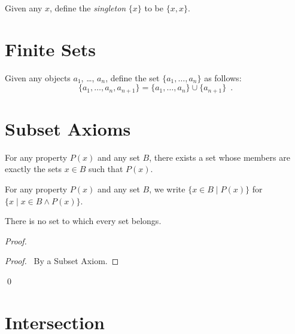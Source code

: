 \begin{definition}
    Given any $x$, define the \emph{singleton} $\{ x \}$ to be $\{ x, x \}$.    
\end{definition}

\section{Finite Sets}

\begin{definitions}
    Given any objects $a_1$, \ldots, $a_n$, define the set $\{ a_1, \ldots, a_n \}$ as follows:
    \[ \{ a_1, \ldots, a_n, a_{n+1} \} = \{ a_1, \ldots, a_n \} \cup \{ a_{n+1} \} \enspace . \]
\end{definitions}

\section{Subset Axioms}

\begin{axioms}
    For any property $P(x)$ and any set $B$, there exists a set whose members are exactly the sets $x \in B$ such that $P(x)$.
\end{axioms}

\begin{definitions}
    For any property $P(x)$ and any set $B$, we write $\{ x \in B \mid P(x) \}$ for $\{x \mid x \in B \wedge P(x) \}$.
\end{definitions}

\begin{theorem}[Subset]
    There is no set to which every set belongs.
\end{theorem}

\begin{proof}
    \pf
    \begin{proof}
        \pf\ By a Subset Axiom.
    \end{proof}
    \qed
\end{proof}

\section{Intersection}

